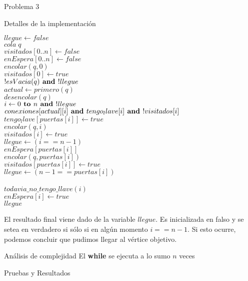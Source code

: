 \begin{section}{Problema 3}
\begin{subsection}{Detalles de la implementación}
		\begin{pseudo}
		\tab $llegue \leftarrow false$\\
		\tab $cola\; q$\\
		\tab $visitados[0..n] \leftarrow false$\\ 
		\tab $enEspera[0..n] \leftarrow false$\\ 
		\tab $encolar(q,0)$\\
		\tab $visitados[0] \leftarrow true$\\
		\tab \WHILE $!esVacia(q) \textbf{ and } !llegue$\\
		\tab \tab $actual \leftarrow primero(q)$\\
		\tab \tab $desencolar(q)$\\
		\tab \tab \FOR $ i\leftarrow0 \textbf{ to } n \textbf{ and } !llegue$\\
		\tab \tab \tab \IF	$conexiones[actual][i] \textbf{ and } tengo_llave[i] \textbf{ and }!visitados[i]$\\
		\tab \tab \tab \tab	$tengo_llave[puertas[i]] \leftarrow true$\\
		\tab \tab \tab \tab	$encolar(q,i)$\\
		\tab \tab \tab \tab	$visitados[i] \leftarrow true$\\
		\tab \tab \tab \tab	$llegue \leftarrow (i == n-1)$\\
		\tab \tab \tab \tab \IF	$enEspera[puertas[i]]$\\
		\tab \tab \tab \tab \tab $encolar(q,puertas[i])$\\
		\tab \tab \tab \tab \tab $visitados[puertas[i]] \leftarrow true$\\
		\tab \tab \tab \tab \tab $llegue \leftarrow (n-1==puertas[i])$\\
		\tab \tab \tab \ELSE \\
		\tab \tab \tab \tab \IF $todavia\_no\_tengo\_llave(i)$\\
		\tab \tab \tab \tab \tab $enEspera[i] \leftarrow true$\\
		\tab \RET $llegue$\\
		\end{pseudo}

		El resultado final viene dado de la variable $llegue$. Es inicializada en falso y se setea en verdadero si sólo si en algún momento $i == n-1$. Si esto ocurre, podemos concluir que pudimos llegar al vértice objetivo.\\
	\end{subsection}


	\begin{subsection}{Análisis de complejidad}
		El \textbf{while} se ejecuta a lo sumo $n$ veces
		
	\end{subsection}


	\begin{subsection}{Pruebas y Resultados}

	\end{subsection}

\end{section}

